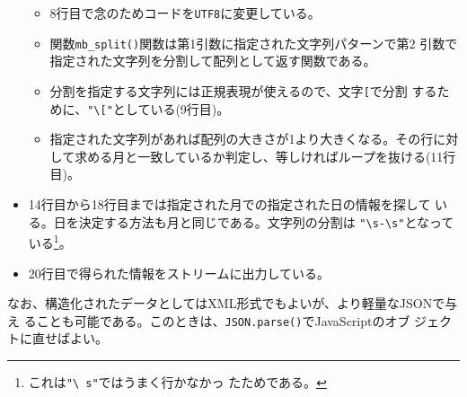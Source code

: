 \begin{Exec}
\begin{itemize}
\begin{itemize}
 \item 8行目で念のためコードを\texttt{UTF8}に変更している。
 \item 関数\Verb+mb_split()+関数は第1引数に指定された文字列パターンで第2
       引数で指定された文字列を分割して配列として返す関数である。
 \item 分割を指定する文字列には正規表現が使えるので、文字\Verb+[+で分割
       するために、\Verb+"\["+としている(9行目)。
 \item 指定された文字列があれば配列の大きさが1より大きくなる。その行に対
       して求める月と一致しているか判定し、等しければループを抜ける(11行
       目)。
\end{itemize}
 \item 14行目から18行目までは指定された月での指定された日の情報を探して
       いる。日を決定する方法も月と同じである。文字列の分割は
       \Verb+"\s-\s"+となっている\footnote{これは\texttt{"\textbackslash
       s"}ではうまく行かなかっ
       たためである。}。
 \item 20行目で得られた情報をストリームに出力している。
\end{itemize}
\end{Exec}
なお、構造化されたデータとしてはXML形式でもよいが、より軽量なJSONで与え
ることも可能である。このときは、\texttt{JSON.parse()}でJavaScriptのオブ
ジェクトに直せばよい。

